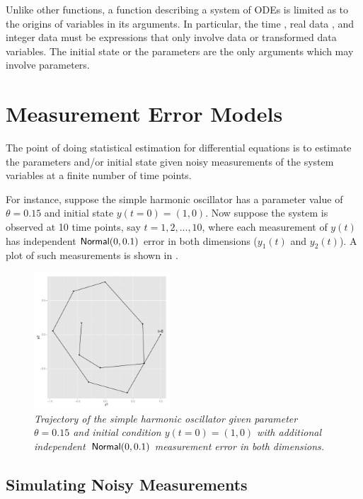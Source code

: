 Unlike other functions, a function describing a system of ODEs is
limited as to the origins of variables in its arguments.  In particular,
the time , real data , and integer data 
must be expressions that only involve data or transformed data
variables.  The initial state  or the parameters 
are the only arguments which may involve parameters.


\section{Measurement Error Models}

The point of doing statistical estimation for differential equations
is to estimate the parameters and/or initial state given noisy
measurements of the system variables at a finite number of time
points.

For instance, suppose the simple harmonic oscillator has a parameter
value of $\theta = 0.15$ and initial state $y(t=0) = (1,0)$.  Now
suppose the system is observed at 10 time points, say $t=1, 2, ...,
10$, where each measurement of $y(t)$ has independent
$\distro{Normal}(0, 0.1)$ error in both dimensions ($y_1(t)$ and
$y_2(t)$).  A plot of such measurements is shown in
.
%
\begin{figure}
\begin{center}
\includegraphics[height=2in]{img/sho-ode-trajectory.pdf}%
\end{center}
\vspace*{-0.25in}
\caption{\small\it Trajectory of the simple harmonic oscillator given
  parameter $\theta=0.15$ and initial condition $y(t=0) = (1,0)$ with
  additional independent\ $\distro{Normal}(0,0.1)$ measurement error
  in both dimensions.}%
\label{sho-trajectory.figure}
\end{figure}



\subsection{Simulating Noisy Measurements}

